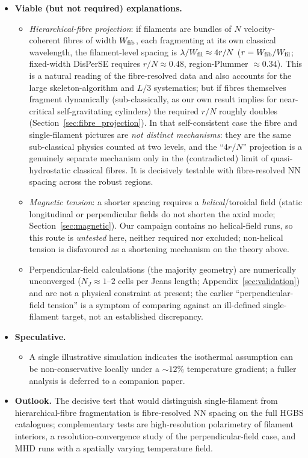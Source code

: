\documentclass[usenatbib,twoside,twocolumn]{mnras}
\begin{document}
\begin{itemize}
    \item \textbf{Viable (but not required) explanations.}
    \begin{itemize}
        \item \emph{Hierarchical-fibre projection}: if filaments are bundles of $N$ velocity-coherent fibres of width $W_{\rm fib}$, each fragmenting at its own classical wavelength, the filament-level spacing is $\lambda/W_{\rm fil}\approx4r/N$ ($r=W_{\rm fib}/W_{\rm fil}$; fixed-width DisPerSE requires $r/N\approx0.48$, region-Plummer $\approx0.34$). This is a natural reading of the fibre-resolved data \citep{Yang2024,Hacar2013} and also accounts for the large skeleton-algorithm and $L/3$ systematics; but if fibres themselves fragment dynamically (sub-classically, as our own result implies for near-critical self-gravitating cylinders) the required $r/N$ roughly doubles (Section~\ref{sec:fibre_projection}). In that self-consistent case the fibre and single-filament pictures are \emph{not distinct mechanisms}: they are the same sub-classical physics counted at two levels, and the ``$4r/N$'' projection is a genuinely separate mechanism only in the (contradicted) limit of quasi-hydrostatic classical fibres. It is decisively testable with fibre-resolved NN spacing across the robust regions.
        \item \emph{Magnetic tension}: a shorter spacing requires a \emph{helical}/toroidal field \citep{Fiege2000} (static longitudinal or perpendicular fields do not shorten the axial mode; Section~\ref{sec:magnetic}). Our campaign contains no helical-field runs, so this route is \emph{untested} here, neither required nor excluded; non-helical tension is disfavoured as a shortening mechanism on the theory above.
        \item Perpendicular-field calculations (the majority geometry) are numerically unconverged ($N_J\approx1$--$2$ cells per Jeans length; Appendix~\ref{sec:validation}) and are not a physical constraint at present; the earlier ``perpendicular-field tension'' is a symptom of comparing against an ill-defined single-filament target, not an established discrepancy.
    \end{itemize}

    \item \textbf{Speculative.}
    \begin{itemize}
        \item A single illustrative simulation indicates the isothermal assumption can be non-conservative locally under a $\sim12\%$ temperature gradient; a fuller analysis is deferred to a companion paper.
    \end{itemize}

    \item \textbf{Outlook.} The decisive test that would distinguish single-filament from hierarchical-fibre fragmentation is fibre-resolved NN spacing on the full HGBS catalogues; complementary tests are high-resolution polarimetry of filament interiors, a resolution-convergence study of the perpendicular-field case, and MHD runs with a spatially varying temperature field.
    \end{itemize}
\end{document}
